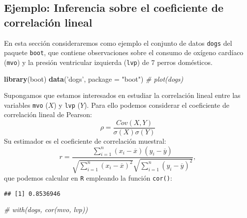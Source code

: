 \documentclass[
]{book}
\newenvironment{Shaded}{\begin{snugshade}}{\end{snugshade}}
\newcommand{\CommentTok}[1]{\textcolor[rgb]{0.56,0.35,0.01}{\textit{#1}}}
\newcommand{\DataTypeTok}[1]{\textcolor[rgb]{0.13,0.29,0.53}{#1}}
\newcommand{\KeywordTok}[1]{\textcolor[rgb]{0.13,0.29,0.53}{\textbf{#1}}}
\newcommand{\NormalTok}[1]{#1}
\newcommand{\OperatorTok}[1]{\textcolor[rgb]{0.81,0.36,0.00}{\textbf{#1}}}
\newcommand{\StringTok}[1]{\textcolor[rgb]{0.31,0.60,0.02}{#1}}
\theoremstyle{break}
\theoremstyle{definition}
\theoremstyle{definition}
\theoremstyle{definition}
\theoremstyle{remark}
\begin{document}
\hypertarget{ejemplo-inferencia-sobre-el-coeficiente-de-correlaciuxf3n-lineal}{%
\subsection{Ejemplo: Inferencia sobre el coeficiente de correlación lineal}\label{ejemplo-inferencia-sobre-el-coeficiente-de-correlaciuxf3n-lineal}}

En esta sección consideraremos como ejemplo el conjunto de datos \texttt{dogs}
del paquete \texttt{boot}, que contiene observaciones sobre el consumo de
oxígeno cardíaco (\texttt{mvo}) y la presión ventricular izquierda (\texttt{lvp})
de 7 perros domésticos.

\begin{Shaded}
\begin{Highlighting}[]
\KeywordTok{library}\NormalTok{(boot)}
\KeywordTok{data}\NormalTok{(}\StringTok{'dogs'}\NormalTok{, }\DataTypeTok{package =} \StringTok{"boot"}\NormalTok{)}
\CommentTok{# plot(dogs)}
\end{Highlighting}
\end{Shaded}

Supongamos que estamos interesados en estudiar la correlación lineal
entre las variables \texttt{mvo} (\(X\)) y \texttt{lvp} (\(Y\)).
Para ello podemos considerar el coeficiente de correlación lineal de Pearson:
\[\rho =\frac{ Cov \left( X, Y \right) }
{ \sigma \left( X \right) \sigma \left( Y \right) }\]
Su estimador es el coeficiente de correlación muestral:
\[r=\frac{\sum_{i=1}^{n}(x_i-\overline{x})(y_i-\overline{y})}
{\sqrt{ \sum_{i=1}^{n}(x_i-\overline{x})^{2}} 
\sqrt{\sum_{i=1}^{n}(y_i-\overline{y})^{2}}},\]
que podemos calcular en \texttt{R} empleando la función \texttt{cor()}:

\begin{Shaded}
\end{Shaded}

\begin{verbatim}
## [1] 0.8536946
\end{verbatim}

\begin{Shaded}
\begin{Highlighting}[]
\CommentTok{# with(dogs, cor(mvo, lvp))}
\end{Highlighting}
\end{Shaded}
\end{document}
